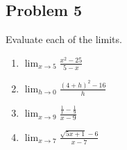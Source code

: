 \documentclass[10pt]{book}
\theoremstyle{definition}
\begin{document}
\subsection*{Problem 5}
Evaluate each of the limits.
\begin{enumerate}[label=(\alph*)]
    \item $\displaystyle \lim_{x\rightarrow 5}\frac{x^2-25}{5-x}$\\[8pt]
    \item $\displaystyle \lim_{h\rightarrow 0}\frac{(4+h)^2-16}{h}$\\[8pt]
    \item $\displaystyle \lim_{x\rightarrow 9}\frac{\frac{1}{x}-\frac{1}{9}}{x-9}$\\[8pt]
    \item $\displaystyle \lim_{x\rightarrow 7}\frac{\sqrt{5x+1}-6}{x-7}$
\end{enumerate}
\end{document}
